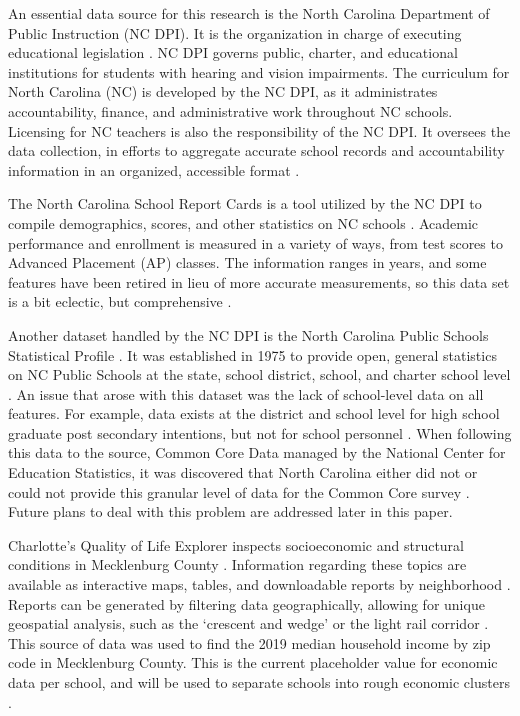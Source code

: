 An essential data source for this research is the North Carolina Department of Public Instruction (NC DPI). 
It is the organization in charge of executing educational legislation \parencite[][]{NCDPI}. NC DPI governs public, charter, and educational institutions for students with hearing and vision impairments. 
The curriculum for North Carolina (NC) is developed by the NC DPI, as it administrates accountability, finance, and administrative work throughout NC schools. 
Licensing for NC teachers is also the responsibility of the NC DPI. It oversees the data collection, in efforts to aggregate accurate school records and accountability information in an organized, accessible format \parencite[][]{NCDPI}.

The North Carolina School Report Cards is a tool utilized by the NC DPI to compile demographics, scores, and other statistics on NC schools \parencite{NCReportCards}.
Academic performance and enrollment is measured in a variety of ways, from test scores to Advanced Placement (AP) classes. 
The information ranges in years, and some features have been retired in lieu of more accurate measurements, so this data set is a bit eclectic, but comprehensive \parencite{NCReportCards}. 

Another dataset handled by the NC DPI is the North Carolina Public Schools Statistical Profile \parencite{NCStats}.
It was established in 1975 to provide open, general statistics on NC Public Schools at the state, school district, school, and charter school level \parencite{NCStats}. 
An issue that arose with this dataset was the lack of school-level data on all features. For example, data exists at the district and school level for high school graduate post secondary intentions, but not for school personnel \parencite{NCStats}. 
When following this data to the source, Common Core Data managed by the National Center for Education Statistics, it was discovered that North Carolina either did not or could not provide this granular level of data for the Common Core survey \parencite{CCD}.
Future plans to deal with this problem are addressed later in this paper. 

Charlotte's Quality of Life Explorer inspects socioeconomic and structural conditions in Mecklenburg County \parencite{quality}.
Information regarding these topics are available as interactive maps, tables, and downloadable reports by neighborhood \parencite{quality}.
Reports can be generated by filtering data geographically, allowing for unique geospatial analysis, such as the `crescent and wedge' or the light rail corridor \parencite{quality}.
This source of data was used to find the 2019 median household income by zip code in Mecklenburg County. 
This is the current placeholder value for economic data per school, and will be used to separate schools into rough economic clusters \parencite{quality}. 
\\


